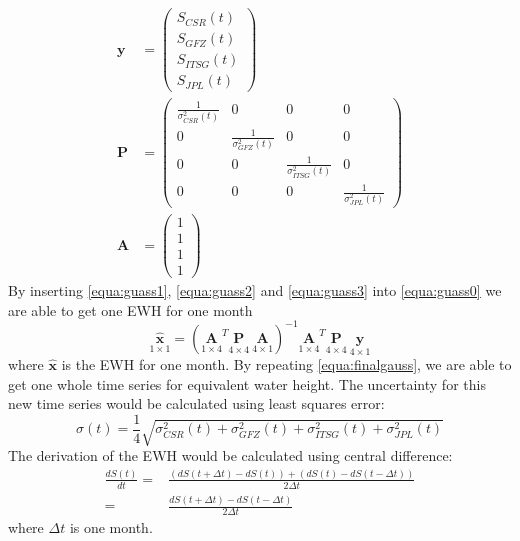 \begin{align}
\bm{y} &= \begin{pmatrix} \label{equa:guass1}
S_{CSR}(t)\\
S_{GFZ}(t)\\
S_{ITSG}(t)\\
S_{JPL}(t)
\end{pmatrix} \\
\bm{P} &= \begin{pmatrix} \label{equa:guass2}
\frac{1}{\sigma^2_{CSR}(t)} & 0 & 0 & 0 \\
0 & \frac{1}{\sigma^2_{GFZ}(t)} & 0 & 0 \\
0 & 0 & \frac{1}{\sigma^2_{ITSG}(t)} & 0 \\
0 & 0 & 0 & \frac{1}{\sigma^2_{JPL}(t)}
\end{pmatrix}\\
\bm{A} &= \begin{pmatrix} \label{equa:guass3}
1\\
1\\
1\\
1
\end{pmatrix}
\end{align}
By inserting \ref{equa:guass1}, \ref{equa:guass2} and \ref{equa:guass3} into \ref{equa:guass0} we are able to get one EWH for one month
\begin{equation} \label{equa:finalgauss}
\underset{1 \times 1}{\hat{\bm{x}}} = (\underset{1 \times 4}{\bm{A}}^T \underset{4 \times 4}{\bm{P}} \  \underset{4 \times 1}{\bm{A}})^{-1} \underset{1 \times 4}{\bm{A}}^T \underset{4 \times 4}{\bm{P}} \  \underset{4 \times 1}{\bm{y}}
\end{equation}
where $\hat{\bm{x}}$ is the EWH for one month. By repeating \ref{equa:finalgauss}, we are able to get one whole time series for equivalent water height. The uncertainty for this new time series would be calculated using least squares error:
\begin{equation}
	\sigma(t) = \frac{1}{4}\sqrt{\sigma^2_{CSR}(t)+\sigma^2_{GFZ}(t)+\sigma^2_{ITSG}(t)+\sigma^2_{JPL}(t)}
\end{equation}
The derivation of the EWH would be calculated using central difference:
\begin{align}\label{eq:dsdt}
\frac{dS(t)}{dt} = &\frac{(dS(t+\Delta t) - dS(t)) + (dS(t) - dS(t-\Delta t))}{2 \Delta t}\\
= & \frac{dS(t+\Delta t) - dS(t-\Delta t)}{2 \Delta t}
\end{align}
where $\Delta t$ is one month. 
